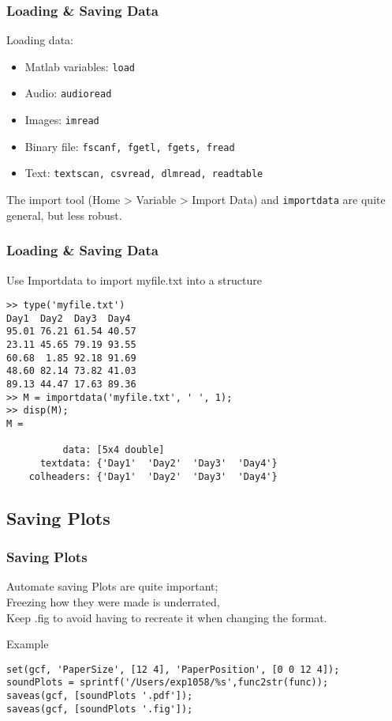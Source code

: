 \documentclass[]{beamer} %
\begin{document}
\begin{frame}[fragile]
\frametitle{Loading \& Saving Data}
Loading data: 
\begin{itemize}
\item Matlab variables: \verb+load+
\item Audio: \verb+audioread+
\item Images: \verb+imread+
\item Binary file: \verb+fscanf, fgetl, fgets, fread+ 
\item Text: \verb+textscan, csvread, dlmread, readtable+
\end{itemize}
The import tool (Home >  Variable > Import Data) and \verb+importdata+ are quite general, but less robust. 
\end{frame}


\begin{frame}[fragile]
\frametitle{Loading \& Saving Data}
\begin{exampleblock}{Use Importdata to import myfile.txt into a structure}
\vspace{-5mm}\begin{verbatim}>> type('myfile.txt')
Day1  Day2  Day3  Day4  
95.01 76.21 61.54 40.57  
23.11 45.65 79.19 93.55 
60.68  1.85 92.18 91.69 
48.60 82.14 73.82 41.03  
89.13 44.47 17.63 89.36 
>> M = importdata('myfile.txt', ' ', 1);
>> disp(M);
M = 

          data: [5x4 double]
      textdata: {'Day1'  'Day2'  'Day3'  'Day4'}
    colheaders: {'Day1'  'Day2'  'Day3'  'Day4'}
    \end{verbatim}
\end{exampleblock}
\end{frame}


\subsection{Saving Plots}
\begin{frame}[fragile]
\frametitle{Saving Plots}\centering
\begin{block}{Automate saving}
Plots are quite important; \\
Freezing how they were made is underrated,\\
Keep .fig to avoid having to recreate it when changing the format.
\end{block}
\begin{exampleblock}{Example}\vspace{-5mm}
\begin{verbatim}set(gcf, 'PaperSize', [12 4], 'PaperPosition', [0 0 12 4]);
soundPlots = sprintf('/Users/exp1058/%s',func2str(func)); 
saveas(gcf, [soundPlots '.pdf']);
saveas(gcf, [soundPlots '.fig']);
\end{verbatim}
\end{exampleblock}
\end{frame}
\end{document}
